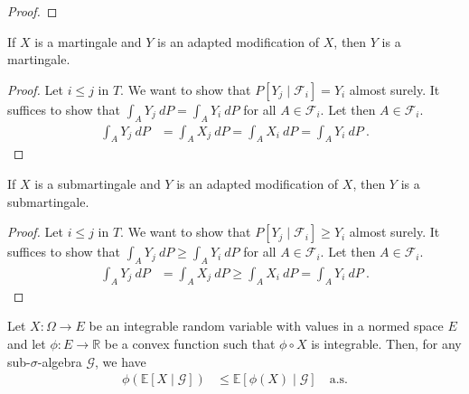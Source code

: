 \begin{proof}\leanok

\end{proof}


\begin{lemma}\label{lem:Martingale.congr}
  \leanok
If $X$ is a martingale and $Y$ is an adapted modification of $X$, then $Y$ is a martingale.
\end{lemma}

\begin{proof}
Let $i \le j$ in $T$. We want to show that $P[Y_j \mid \mathcal{F}_i] = Y_i$ almost surely.
It suffices to show that $\int_A Y_j \: dP = \int_A Y_i \: dP$ for all $A \in \mathcal{F}_i$.
Let then $A \in \mathcal{F}_i$.
\begin{align*}
  \int_A Y_j \: dP
  &= \int_A X_j \: dP
  = \int_A X_i \: dP
  = \int_A Y_i \: dP
  \: .
\end{align*}
\end{proof}


\begin{lemma}\label{lem:Submartingale.congr}
  \leanok
If $X$ is a submartingale and $Y$ is an adapted modification of $X$, then $Y$ is a submartingale.
\end{lemma}

\begin{proof}
Let $i \le j$ in $T$. We want to show that $P[Y_j \mid \mathcal{F}_i] \ge Y_i$ almost surely.
It suffices to show that $\int_A Y_j \: dP \ge \int_A Y_i \: dP$ for all $A \in \mathcal{F}_i$.
Let then $A \in \mathcal{F}_i$.
\begin{align*}
  \int_A Y_j \: dP
  &= \int_A X_j \: dP
  \ge \int_A X_i \: dP
  = \int_A Y_i \: dP
  \: .
\end{align*}
\end{proof}


\begin{lemma}\label{lem:conditional_jensen}
  \leanok
Let $X : \Omega \to E$ be an integrable random variable with values in a normed space $E$ and let $\phi : E \to \mathbb{R}$ be a convex function such that $\phi \circ X$ is integrable.
Then, for any sub-$\sigma$-algebra $\mathcal{G}$, we have
\begin{align*}
  \phi\left( \mathbb{E}[X \mid \mathcal{G}] \right)
  &\le \mathbb{E}[\phi(X) \mid \mathcal{G}] \quad \text{a.s.}
\end{align*}
\end{lemma}

